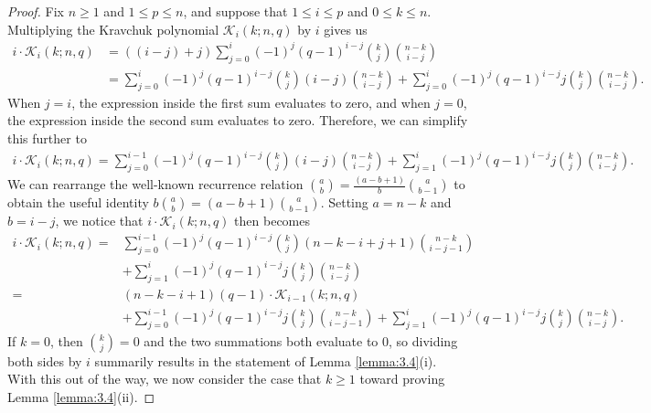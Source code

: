 \documentclass{article}
\def\K{\mathcal{K}}
\numberwithin{equation}{section}
\theoremstyle{plain}
\begin{document}
\begin{proof}
    Fix $n \ge 1$ and $1 \le p \le n$, and suppose that $1 \le i \le p$ and $0 \le k \le n$. Multiplying the Kravchuk polynomial $\K_i(k; n, q)$ by $i$ gives us
    \begin{align*}
        i \cdot \K_i(k; n, q) & = ((i - j) + j) \sum_{j = 0}^i (-1)^j (q - 1)^{i - j} \binom{k}{j} \binom{n - k}{i - j} \\
        & = \sum_{j = 0}^i (-1)^j (q - 1)^{i - j} \binom{k}{j} (i - j) \binom{n - k}{i - j} + \sum_{j = 0}^i (-1)^j (q - 1)^{i - j} j \binom{k}{j} \binom{n - k}{i - j}.
    \end{align*}
    When $j = i$, the expression inside the first sum evaluates to zero, and when $j = 0$, the expression inside the second sum evaluates to zero. Therefore, we can simplify this further to
    \begin{align*}
        i \cdot \K_i(k; n, q) = \sum_{j = 0}^{i - 1} (-1)^j (q - 1)^{i - j} \binom{k}{j} (i - j) \binom{n - k}{i - j} + \sum_{j = 1}^i (-1)^j (q - 1)^{i - j} j \binom{k}{j} \binom{n - k}{i - j}.
    \end{align*}
    We can rearrange the well-known recurrence relation $\binom{a}{b} = \frac{(a - b + 1)}{b}\binom{a}{b - 1}$ to obtain the useful identity $b\binom{a}{b} = (a - b + 1)\binom{a}{b - 1}$. Setting $a = n - k$ and $b = i - j$, we notice that $i \cdot \K_i(k; n, q)$ then becomes
    \begin{align*}
        i \cdot \K_i(k; n, q) ={} & \sum_{j = 0}^{i - 1} (-1)^j (q - 1)^{i - j} \binom{k}{j} (n - k - i + j + 1) \binom{n - k}{i - j - 1} \\
        & + \sum_{j = 1}^i (-1)^j (q - 1)^{i - j} j \binom{k}{j} \binom{n - k}{i - j} \\
        ={} & (n - k - i + 1)(q - 1) \cdot \K_{i - 1}(k; n, q) \\
        & + \sum_{j = 0}^{i - 1} (-1)^j (q - 1)^{i - j} j \binom{k}{j} \binom{n - k}{i - j - 1} + \sum_{j = 1}^i (-1)^j (q - 1)^{i - j} j \binom{k}{j} \binom{n - k}{i - j}.
    \end{align*}
    If $k = 0$, then $\binom{k}{j} = 0$ and the two summations both evaluate to $0$, so dividing both sides by $i$ summarily results in the statement of Lemma \ref{lemma:3.4}(i). With this out of the way, we now consider the case that $k \ge 1$ toward proving Lemma \ref{lemma:3.4}(ii).


\end{proof}
\end{document}
